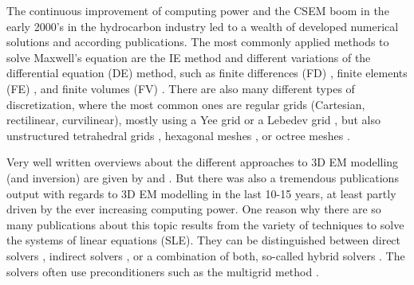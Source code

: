\documentclass[onecolumn,extra,camera]{gji}
\begin{document}
The continuous improvement of computing power and the CSEM boom in the early 2000's in the hydrocarbon industry led to a wealth of developed numerical solutions and according publications. The most commonly applied methods to solve Maxwell's equation are the IE method \citep{GJI.74.Raiche, RS.02.Hursan, GEO.06.Zhdanov, GP.10.Tehrani, CAG.16.Kruglyakov, MGS.17.Kruglyakov} and different variations of the differential equation (DE) method, such as finite differences (FD) \citep{GEO.93.Wang, RS.94.Druskin, RSC.94.Mackie, GEO.09.Streich, CAG.13.Sommer}, finite elements (FE) \citep{GEO.04.Commer, GJI.11.Schwarzbach,GEO.12.daSilva, GJI.13.Grayver, GJI.13.Puzyrev, SEG.16.Zhang}, and finite volumes (FV) \citep{EM.90.Madsen, SIAM.01.Haber, PIER.01.Clemens, GEO.14.Jahandari}. There are also many different types of discretization, where the most common ones are regular grids (Cartesian, rectilinear, curvilinear), mostly using a Yee grid \citep{IEEE.66.Yee} or a Lebedev grid \citep{CMMP.64.Lebedev}, but also unstructured tetrahedral grids \citep{SEG.16.Zhang, CAG.17.Cai}, hexagonal meshes \citep{CAG.14.Cai}, or octree meshes \citep{ECP.07.Haber}.

Very well written overviews about the different approaches to 3D EM modelling (and inversion) are given by \cite{SG.05.Avdeev} and \cite{SG.10.Borner}. But there was also a tremendous publications output with regards to 3D EM modelling in the last 10-15 years, at least partly driven by the ever increasing computing power. One reason why there are so many publications about this topic results from the variety of techniques to solve the systems of linear equations (SLE). They can be distinguished between direct solvers \citep{GEO.09.Streich, GP.14.Chung, GEO.14.Jaysaval, GEO.15.Grayver, SEG.15.Oh, GJI.18.Wang}, indirect solvers \citep{GP.06.Mulder, GJI.15.Jaysaval}, or a combination of both, so-called hybrid solvers \citep{GEO.18.Liu}. The solvers often use preconditioners such as the multigrid method \citep{SIAM.02.Aruliah, GJI.16.Jaysaval}.
\end{document}
